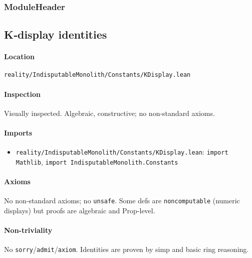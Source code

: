 \documentclass{article}
\newcommand{\FileRef}[1]{\texttt{#1}}
\newcommand{\ModuleHeader}[3]{%
  \subsection{#1}
  \paragraph{Location} \FileRef{#2}\\
  \paragraph{Inspection} #3
}
\begin{document}
\subsubsection{ModuleHeader}
\ModuleHeader{K‑display identities}{reality/IndisputableMonolith/Constants/KDisplay.lean}{Visually inspected. Algebraic, constructive; no non‑standard axioms.}

\paragraph{Imports}
\begin{itemize}[leftmargin=*]
  \item \FileRef{reality/IndisputableMonolith/Constants/KDisplay.lean}: \texttt{import Mathlib}, \texttt{import IndisputableMonolith.Constants}
\end{itemize}

\paragraph{Axioms}
No non‑standard axioms; no \texttt{unsafe}. Some defs are \texttt{noncomputable} (numeric displays) but proofs are algebraic and Prop‑level.

\paragraph{Non-triviality}
No \texttt{sorry}/\texttt{admit}/\texttt{axiom}. Identities are proven by simp and basic ring reasoning.
\end{document}
